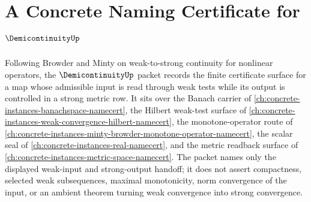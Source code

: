 \chapter{A Concrete Naming Certificate for $\DemicontinuityUp$}
\label{ch:concrete-instances-demicontinuity-namecert}

Following Browder and Minty on weak-to-strong continuity for nonlinear operators, the $\DemicontinuityUp$ packet records the finite certificate surface for a map whose admissible input is read through weak tests while its output is controlled in a strong metric row. It sits over the Banach carrier of \autoref{ch:concrete-instances-banachspace-namecert}, the Hilbert weak-test surface of \autoref{ch:concrete-instances-weak-convergence-hilbert-namecert}, the monotone-operator route of \autoref{ch:concrete-instances-minty-browder-monotone-operator-namecert}, the scalar seal of \autoref{ch:concrete-instances-real-namecert}, and the metric readback surface of \autoref{ch:concrete-instances-metric-space-namecert}. The packet names only the displayed weak-input and strong-output handoff; it does not assert compactness, selected weak subsequences, maximal monotonicity, norm convergence of the input, or an ambient theorem turning weak convergence into strong convergence.

